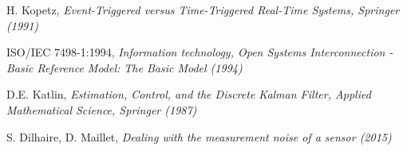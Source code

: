 \begin{thebibliography}{9}
H. Kopetz, \emph{Event-Triggered versus Time-Triggered Real-Time Systems, Springer (1991)}

ISO/IEC 7498-1:1994, \textit{
Information technology, Open Systems Interconnection - Basic Reference Model: The Basic Model (1994)}

D.E. Katlin, \textit{Estimation, Control, and the Discrete Kalman Filter, Applied Mathematical Science, Springer (1987)}

S. Dilhaire, D. Maillet, \textit{Dealing  with the measurement noise of a sensor (2015)}

\end{thebibliography}